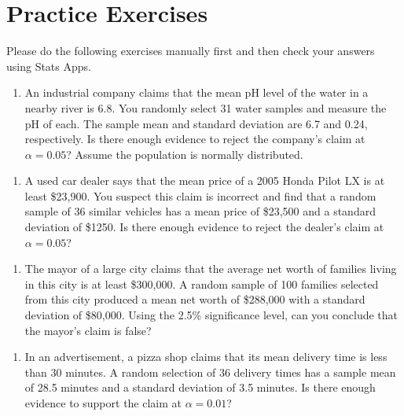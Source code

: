 \documentclass[
]{book}
\providecommand{\tightlist}{%
  \setlength{\itemsep}{0pt}\setlength{\parskip}{0pt}}
\begin{document}
\hfill\break

\hypertarget{practice-exercises-2}{%
\section{Practice Exercises}\label{practice-exercises-2}}

Please do the following exercises manually first and then check your answers using Stats Apps.

\begin{enumerate}
\def\labelenumi{\arabic{enumi}.}
\tightlist
\item
  An industrial company claims that the mean pH level of the water in a nearby river is 6.8. You randomly select 31 water samples and measure the pH of each. The sample mean and standard deviation are 6.7 and 0.24, respectively. Is there enough evidence to reject the company's claim at \(\alpha = 0.05\)? Assume the population is normally distributed.
\end{enumerate}

\hfill\break

\begin{enumerate}
\def\labelenumi{\arabic{enumi}.}
\setcounter{enumi}{1}
\tightlist
\item
  A used car dealer says that the mean price of a 2005 Honda Pilot LX is at least \$23,900. You suspect this claim is incorrect and find that a random sample of 36 similar vehicles has a mean price of \$23,500 and a standard deviation of \$1250. Is there enough evidence to reject the dealer's claim at \(\alpha = 0.05\)?
\end{enumerate}

\hfill\break

\begin{enumerate}
\def\labelenumi{\arabic{enumi}.}
\setcounter{enumi}{2}
\tightlist
\item
  The mayor of a large city claims that the average net worth of families living in this city is at least \$300,000. A random sample of 100 families selected from this city produced a mean net worth of \$288,000 with a standard deviation of \$80,000. Using the 2.5\% significance level, can you conclude that the mayor's claim is false?
\end{enumerate}

\hfill\break

\begin{enumerate}
\def\labelenumi{\arabic{enumi}.}
\setcounter{enumi}{3}
\tightlist
\item
  In an advertisement, a pizza shop claims that its mean delivery time is less than 30 minutes. A random selection of 36 delivery times has a sample mean of 28.5 minutes and a standard deviation of 3.5 minutes. Is there enough evidence to support the claim at \(\alpha = 0.01\)?
\end{enumerate}
\end{document}
